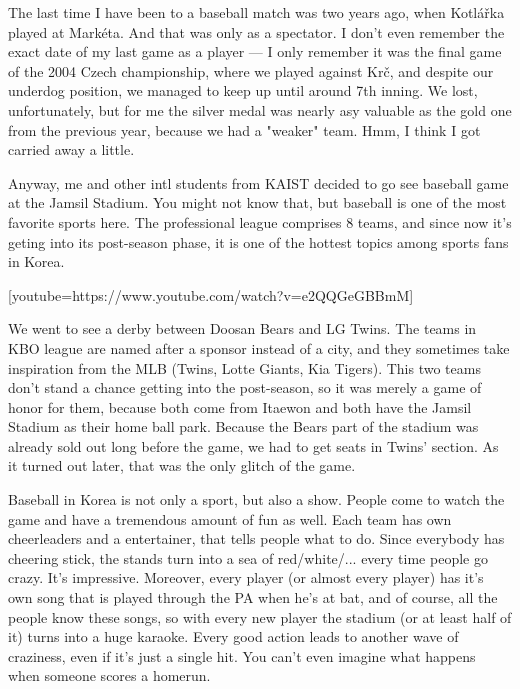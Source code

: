 \begin{post}
	\begin{content}
The last time I have been to a baseball match was two years ago, when Kotlářka played at Markéta. And that was only as a spectator. I don't even remember the exact date of my last game as a player — I only remember it was the final game of the 2004 Czech championship, where we played against Krč, and despite our underdog position, we managed to keep up until around 7th inning. We lost, unfortunately, but for me the silver medal was nearly asy valuable as the gold one from the previous year, because we had a "weaker" team. Hmm, I think I got carried away a little.



Anyway, me and other intl students from KAIST decided to go see baseball game at the Jamsil Stadium. You might not know that, but baseball is one of the most favorite sports here. The professional league comprises 8 teams, and since now it's geting into its post-season phase, it is one of the hottest topics among sports fans in Korea.



[youtube=https://www.youtube.com/watch?v=e2QQGeGBBmM]



We went to see a derby between Doosan Bears and LG Twins. The teams in KBO league are named after a sponsor instead of a city, and they sometimes take inspiration from the MLB (Twins, Lotte Giants, Kia Tigers). This two teams don't stand a chance getting into the post-season, so it was merely a game of honor for them, because both come from Itaewon and both have the Jamsil Stadium as their home ball park. Because the Bears part of the stadium was already sold out long before the game, we had to get seats in Twins' section. As it turned out later, that was the only glitch of the game.



Baseball in Korea is not only a sport, but also a show. People come to watch the game and have a tremendous amount of fun as well. Each team has own cheerleaders and a entertainer, that tells people what to do. Since everybody has cheering stick, the stands turn into a sea of red/white/... every time people go crazy. It's impressive. Moreover, every player (or almost every player) has it's own song that is played through the PA when he's at bat, and of course, all the people know these songs, so with every new player the stadium (or at least half of it) turns into a huge karaoke. Every good action leads to another wave of craziness, even if it's just a single hit. You can't even imagine what happens when someone scores a homerun.




\end{content}
\end{post}
